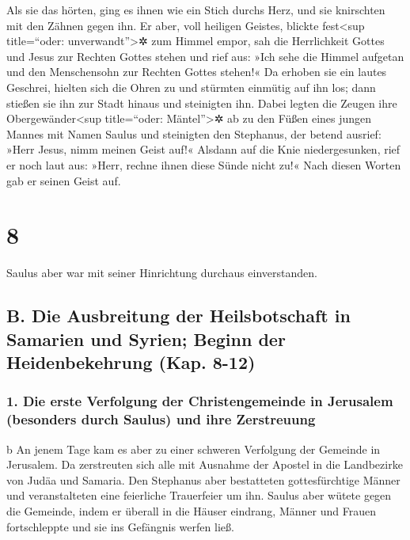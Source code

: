  Als sie das hörten, ging es ihnen wie ein Stich durchs
Herz, und sie knirschten mit den Zähnen gegen ihn.  Er
aber, voll heiligen Geistes, blickte fest\textless sup title=``oder:
unverwandt''\textgreater✲ zum Himmel empor, sah die Herrlichkeit Gottes
und Jesus zur Rechten Gottes stehen  und rief aus: »Ich
sehe die Himmel aufgetan und den Menschensohn zur Rechten Gottes
stehen!«  Da erhoben sie ein lautes Geschrei, hielten
sich die Ohren zu und stürmten einmütig auf ihn los; 
dann stießen sie ihn zur Stadt hinaus und steinigten ihn. Dabei legten
die Zeugen ihre Obergewänder\textless sup title=``oder:
Mäntel''\textgreater✲ ab zu den Füßen eines jungen Mannes mit Namen
Saulus  und steinigten den Stephanus, der betend ausrief:
»Herr Jesus, nimm meinen Geist auf!«  Alsdann auf die
Knie niedergesunken, rief er noch laut aus: »Herr, rechne ihnen diese
Sünde nicht zu!« Nach diesen Worten gab er seinen Geist auf.

\hypertarget{section-7}{%
\section{8}\label{section-7}}

 Saulus aber war mit seiner Hinrichtung durchaus
einverstanden.

\hypertarget{b.-die-ausbreitung-der-heilsbotschaft-in-samarien-und-syrien-beginn-der-heidenbekehrung-kap.-8-12}{%
\subsection{B. Die Ausbreitung der Heilsbotschaft in Samarien und
Syrien; Beginn der Heidenbekehrung (Kap.
8-12)}\label{b.-die-ausbreitung-der-heilsbotschaft-in-samarien-und-syrien-beginn-der-heidenbekehrung-kap.-8-12}}

\hypertarget{die-erste-verfolgung-der-christengemeinde-in-jerusalem-besonders-durch-saulus-und-ihre-zerstreuung}{%
\subsubsection{1. Die erste Verfolgung der Christengemeinde in Jerusalem
(besonders durch Saulus) und ihre
Zerstreuung}\label{die-erste-verfolgung-der-christengemeinde-in-jerusalem-besonders-durch-saulus-und-ihre-zerstreuung}}

b An jenem Tage kam es aber zu einer schweren Verfolgung der Gemeinde in
Jerusalem. Da zerstreuten sich alle mit Ausnahme der Apostel in die
Landbezirke von Judäa und Samaria.  Den Stephanus aber
bestatteten gottesfürchtige Männer und veranstalteten eine feierliche
Trauerfeier um ihn.  Saulus aber wütete gegen die
Gemeinde, indem er überall in die Häuser eindrang, Männer und Frauen
fortschleppte und sie ins Gefängnis werfen ließ.

